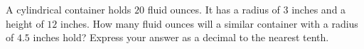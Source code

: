 A cylindrical container holds $20$ fluid ounces. It has a radius of $3$ inches and a height of $12$ inches. How many fluid ounces will a similar container with a radius of $4.5$ inches hold? Express your answer as a decimal to the nearest tenth.
